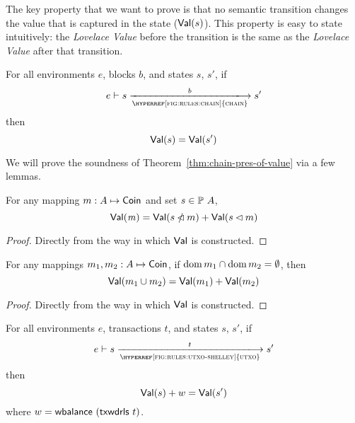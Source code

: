 \noindent
The key property that we want to prove is that no semantic transition changes the value that
is captured in the state ($\mathsf{Val}{(s)}$).
This property is easy to state intuitively:
the \emph{Lovelace Value} before the transition is the same as the
\emph{Lovelace Value} after that transition.

\begin{theorem}
  \label{thm:chain-pres-of-value}
  For all environments $e$, blocks $b$, and states $s$, $s'$, if
  \begin{equation*}
    e\vdash s\trans{\hyperref[fig:rules:chain]{chain}}{b}s'
  \end{equation*}
  then
  \begin{equation*}
    \mathsf{Val}(s) = \mathsf{Val}(s')
  \end{equation*}
\end{theorem}

\noindent
We will prove the soundness of Theorem~\ref{thm:chain-pres-of-value} via a few lemmas.

\begin{lemma}
  \label{lemma:value-sum-pres-1}
  For any mapping $m:A\mapsto\mathsf{Coin}$ and set $s\in\mathbb{P}~A$,
  \begin{equation*}
    \mathsf{Val}(\mathit{m}) = \mathsf{Val}(s\mathbin{\slashed{\lhd}} m) + \mathsf{Val}(s\lhd m)
  \end{equation*}
\end{lemma}
\begin{proof}
  Directly from the way in which $\mathsf{Val}{}$ is constructed.
\end{proof}

\begin{lemma}
  \label{lemma:value-sum-pres-2}
  For any mappings $m_1, m_2:A\mapsto\mathsf{Coin}$,
  if $\operatorname{dom}{m_1}\cap\operatorname{dom}{m_2}=\emptyset$,
  then
  \begin{equation*}
    \mathsf{Val}(m_1\cup m_2) = \mathsf{Val}(m_1) + \mathsf{Val}(m_2)
  \end{equation*}
\end{lemma}
\begin{proof}
  Directly from the way in which $\mathsf{Val}{}$ is constructed.
\end{proof}

\begin{lemma}
  \label{lemma:utxo-pres-of-value}
  For all environments $e$, transactions $t$, and states $s$, $s'$, if
  \begin{equation*}
    e\vdash s\trans{\hyperref[fig:rules:utxo-shelley]{utxo}}{t}s'
  \end{equation*}
  then
  \begin{equation*}
    \mathsf{Val}(s) + w = \mathsf{Val}(s')
  \end{equation*}
  where $w = \mathsf{wbalance}~(\mathsf{txwdrls}~{t})$.
\end{lemma}

